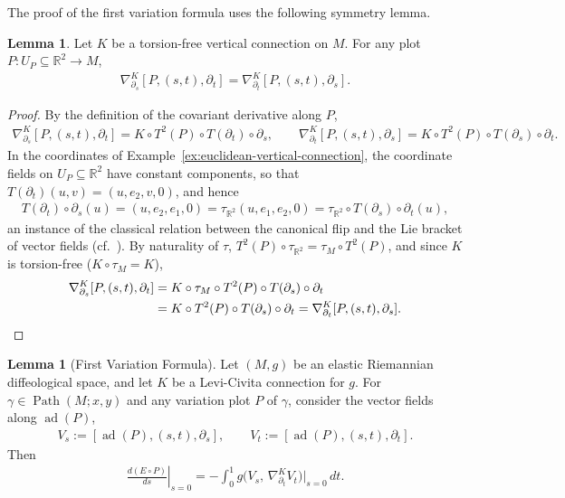 \documentclass{amsart}
\newcommand{\R}{\mathbb{R}}
\DeclareMathOperator{\Path}{Path}
\DeclareMathOperator{\ad}{ad}
\theoremstyle{definition}
\newtheorem{lem}[thm]{Lemma}
\begin{document}
The proof of the first variation formula uses the following symmetry lemma.

\begin{lem}\label{lem:symmetry}
  Let $K$ be a torsion-free vertical connection on $M$.
  For any plot $P \colon U_P \subseteq \R^2 \to M$,
  \begin{align*}
    \nabla^{K}_{\partial_s}[P, (s, t), \partial_t]
      = \nabla^{K}_{\partial_t}[P, (s, t), \partial_s].
  \end{align*}
\end{lem}

\begin{proof}
  By the definition of the covariant derivative along $P$,
  \begin{align*}
    \nabla^{K}_{\partial_s} [P, (s, t), \partial_t]
      = K \circ T^2(P) \circ T(\partial_t) \circ \partial_s,
    \qquad
    \nabla^{K}_{\partial_t}[P, (s, t), \partial_s]
      = K \circ T^2(P) \circ T(\partial_s) \circ \partial_t.
  \end{align*}
  In the coordinates of Example~\ref{ex:euclidean-vertical-connection}, the coordinate fields on $U_P \subseteq \R^2$ have constant components, so that $T(\partial_t)(u, v) = (u, e_2, v, 0)$, and hence
  \begin{align*}
    T(\partial_t) \circ \partial_s(u)
      = (u, e_2, e_1, 0)
      = \tau_{\R^2}(u, e_1, e_2, 0)
      = \tau_{\R^2} \circ T(\partial_s) \circ \partial_t(u),
  \end{align*}
  an instance of the classical relation between the canonical flip and the Lie bracket of vector fields (cf.\ \cite[Lemma~6.13]{KMS}).
  By naturality of $\tau$, $T^2(P) \circ \tau_{\R^2} = \tau_M \circ T^2(P)$, and since $K$ is torsion-free ($K \circ \tau_M = K$),
  \begin{align*}
    \nabla^{K}_{\partial_s}[P, (s, t), \partial_t]
      &= K \circ \tau_M \circ T^2(P) \circ T(\partial_s) \circ \partial_t \\
      &= K \circ T^2(P) \circ T(\partial_s) \circ \partial_t
       = \nabla^{K}_{\partial_t}[P, (s, t), \partial_s]. \qedhere
  \end{align*}
\end{proof}

\begin{lem}[First Variation Formula]\label{lem:first-variation-formula}
  Let $(M, g)$ be an elastic Riemannian diffeological space, and let $K$ be a Levi-Civita connection for $g$. 
  For $\gamma \in \Path(M; x, y)$ and any variation plot $P$ of $\gamma$, consider the vector fields along $\ad(P)$,
  \begin{align*}
    V_s := [\ad(P), (s, t), \partial_s],
    \qquad
    V_t := [\ad(P), (s, t), \partial_t].
  \end{align*}
  Then
  \begin{align*}
      \left. \frac{d(E \circ P)}{ds} \right|_{s = 0}
        = - \int_0^1 g\bigl(V_s,\, \nabla^{K}_{\partial_t} V_t\bigr)
          \Big|_{s=0} \, dt.
  \end{align*}
\end{lem}
\end{document}
